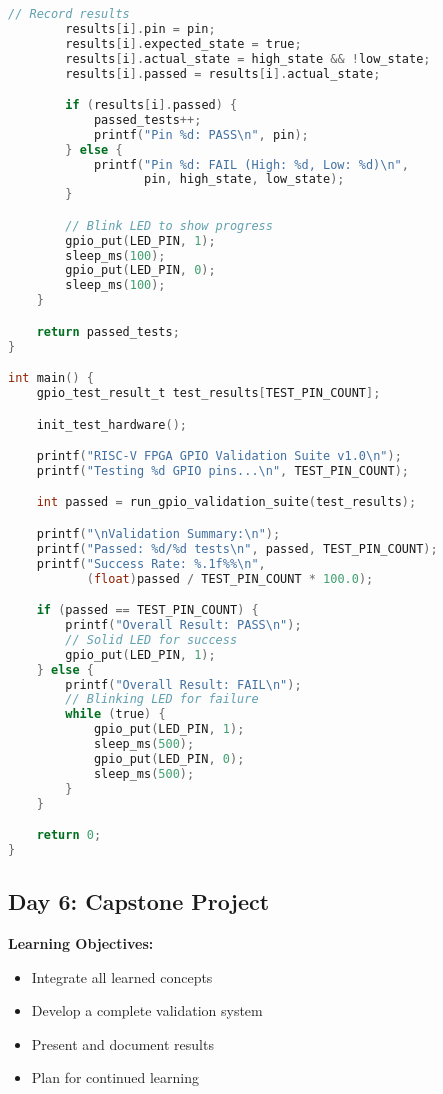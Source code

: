 \documentclass[11pt,a4paper]{article}
\begin{document}
\begin{lstlisting}[language=C, caption=Day 5 Example: GPIO Validation Test]
        // Record results
        results[i].pin = pin;
        results[i].expected_state = true;
        results[i].actual_state = high_state && !low_state;
        results[i].passed = results[i].actual_state;

        if (results[i].passed) {
            passed_tests++;
            printf("Pin %d: PASS\n", pin);
        } else {
            printf("Pin %d: FAIL (High: %d, Low: %d)\n",
                   pin, high_state, low_state);
        }

        // Blink LED to show progress
        gpio_put(LED_PIN, 1);
        sleep_ms(100);
        gpio_put(LED_PIN, 0);
        sleep_ms(100);
    }

    return passed_tests;
}

int main() {
    gpio_test_result_t test_results[TEST_PIN_COUNT];

    init_test_hardware();

    printf("RISC-V FPGA GPIO Validation Suite v1.0\n");
    printf("Testing %d GPIO pins...\n", TEST_PIN_COUNT);

    int passed = run_gpio_validation_suite(test_results);

    printf("\nValidation Summary:\n");
    printf("Passed: %d/%d tests\n", passed, TEST_PIN_COUNT);
    printf("Success Rate: %.1f%%\n",
           (float)passed / TEST_PIN_COUNT * 100.0);

    if (passed == TEST_PIN_COUNT) {
        printf("Overall Result: PASS\n");
        // Solid LED for success
        gpio_put(LED_PIN, 1);
    } else {
        printf("Overall Result: FAIL\n");
        // Blinking LED for failure
        while (true) {
            gpio_put(LED_PIN, 1);
            sleep_ms(500);
            gpio_put(LED_PIN, 0);
            sleep_ms(500);
        }
    }

    return 0;
}
\end{lstlisting}

\subsection{Day 6: Capstone Project}

\textbf{Learning Objectives:}
\begin{itemize}
    \item Integrate all learned concepts
    \item Develop a complete validation system
    \item Present and document results
    \item Plan for continued learning
\end{itemize}
\end{document}
